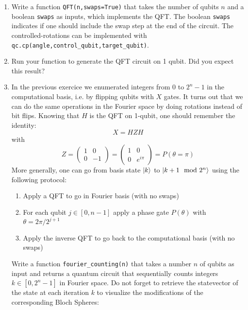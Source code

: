 \documentclass{article}
\begin{document}
\begin{enumerate}
    \item Write a function \verb|QFT(n,swaps=True)| that takes the number of qubits $n$ and a boolean \verb|swaps| as inputs, which implements the QFT. The boolean \verb|swaps| indicates if one should include the swap step at the end of the circuit. The controlled-rotations can be implemented with \verb|qc.cp(angle,control_qubit,target_qubit)|.%
    \item Run your function to generate the QFT circuit on 1 qubit. Did you expect this result?
    \item In the previous exercice we enumerated integers from $0$ to $2^n-1$ in the computational basis, i.e. by flipping qubits with $X$ gates. It turns out that we can do the same operations in the Fourier space by doing rotations instead of bit flips. Knowing that $H$ is the QFT on 1-qubit, one should remember the identity:
    \begin{equation*}
        X = HZH
    \end{equation*}
    with
    \begin{equation*}
        Z = \begin{pmatrix}
            1 & 0 \\
            0 & -1
        \end{pmatrix}
        = \begin{pmatrix}
            1 & 0 \\
            0 & e^{i\pi}
        \end{pmatrix}
        = P(\theta=\pi)
    \end{equation*}
    More generally, one can go from basis state $\ket{k}$ to $\ket{k+1\mod 2^n}$ using the following protocol:
    \begin{enumerate}
        \item Apply a QFT to go in Fourier basis (with no swaps)
        \item For each qubit $j\in [0,n-1]$ apply a phase gate $P(\theta)$ with $\theta=2\pi/2^{j+1}$
        \item Apply the inverse QFT to go back to the computational basis (with no swaps)
    \end{enumerate}
    Write a function \verb|fourier_counting(n)| that takes a number $n$ of qubits as input and returns a quantum circuit that sequentially counts integers $k\in [0,2^n-1]$ in Fourier space. Do not forget to retrieve the statevector of the state at each iteration $k$ to visualize the modifications of the corresponding Bloch Spheres:

\end{enumerate}
\end{document}
